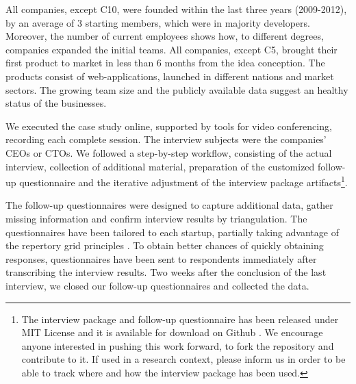\documentclass[10pt,journal,letterpaper,compsoc]{IEEEtran}
\begin{document}
All companies, except C10, were founded within the last three years (2009-2012), %
by an average of 3 starting members, which were in majority developers. Moreover, the number of current employees shows how, to different degrees, companies expanded the initial teams. All companies, except C5, brought their first product to market in less than 6 months from the idea conception. The products consist of web-applications, launched in different nations and market sectors. The growing team size and the publicly available data suggest an healthy status of the businesses.

We executed the case study online, supported by tools for video conferencing, recording each complete session. The interview subjects were the companies' CEOs or CTOs. We followed a step-by-step workflow, consisting of the actual interview, collection of additional material, preparation of the customized follow-up questionnaire and the iterative adjustment of the interview package artifacts\footnote{The interview package and follow-up questionnaire has been released under MIT License \cite{MITLicense} and it is available for download on Github \cite{GitHubInterviewPackage}. We encourage anyone interested in pushing this work forward, to fork the repository and contribute to it. If used in a research context, please inform us in order to be able to track where and how the interview package has been used.}.

The follow-up questionnaires were designed to capture additional data, gather missing information and confirm interview results by triangulation. The questionnaires have been tailored to each startup, partially taking advantage of the repertory grid principles \cite{Edwards2009}. To obtain better chances of quickly obtaining responses, questionnaires have been sent to respondents immediately after transcribing the interview results. Two weeks after the conclusion of the last interview, we closed our follow-up questionnaires and collected the data. %

\end{document}
